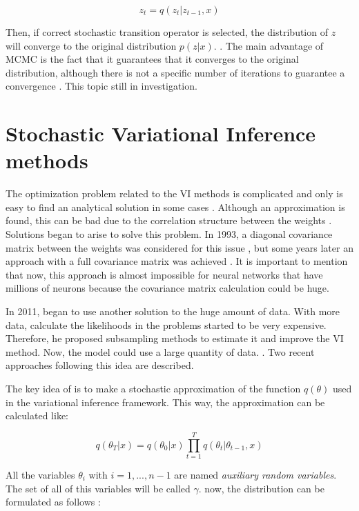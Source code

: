 \documentclass{article}
\begin{document}
\begin{equation}\label{eq:7}
z_t = q(z_t | z_{t-1}, x)
\end{equation}

Then, if correct stochastic transition operator is selected, the distribution of $z$ will converge to the original distribution $p(z|x)$. \cite{salimans2015markov}. The main advantage of MCMC is the fact that it guarantees that it converges to the original distribution, although there is not a specific number of iterations to guarantee a convergence \cite{salimans2015markov}. This topic still in investigation.

\section{Stochastic Variational Inference methods}

The optimization problem related to the VI methods is complicated and only is easy to find an analytical solution in some cases \cite{gal2016uncertainty}. Although an approximation is found, this can be bad due to the correlation structure between the weights \cite{gal2016uncertainty}. Solutions began to arise to solve this problem. In 1993, a diagonal covariance matrix between the weights was considered for this issue \cite{hinton1993keeping}, but some years later an approach with a full covariance matrix was achieved \cite{barber1998ensemble}. It is important to mention that now, this approach is almost impossible for neural networks that have millions of neurons because the covariance matrix calculation could be huge. 

In 2011, \cite{graves2011practical} began to use another solution to the huge amount of data. With more data, calculate the likelihoods in the problems started to be very expensive. Therefore, he proposed subsampling methods to estimate it and improve the VI method. Now, the model could use a large quantity of data. \cite{gal2016uncertainty}. Two recent approaches following this idea are described.

The key idea of \cite{salimans2015markov} is to make a stochastic approximation of the function $q(\theta)$ used in the variational inference framework. This way, the approximation can be calculated like:

\begin{equation}
q(\theta_T|x) = q(\theta_0|x) \prod_{t=1}^{T} q(\theta_t| \theta_{t-1}, x)
\end{equation}

All the variables $\theta_i$ with ${i = 1, ..., n-1}$ are named \textit{auxiliary random variables}. The set of all of this variables will be called $\gamma$. now, the distribution can be formulated as follows \cite{salimans2015markov}:
\end{document}

